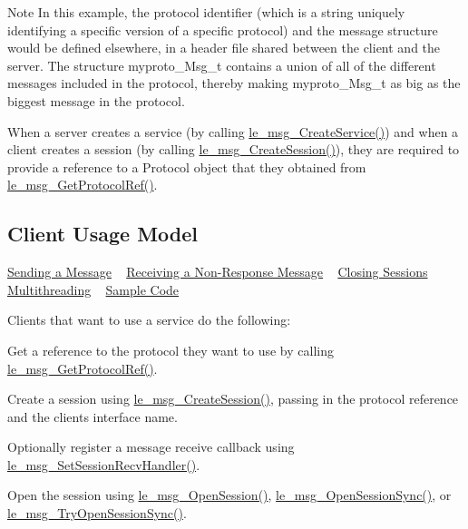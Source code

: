 \begin{DoxyNote}{Note}
In this example, the protocol identifier (which is a string uniquely identifying a specific version of a specific protocol) and the message structure would be defined elsewhere, in a header file shared between the client and the server. The structure {\ttfamily myproto\+\_\+\+Msg\+\_\+t} contains a {\ttfamily union} of all of the different messages included in the protocol, thereby making {\ttfamily myproto\+\_\+\+Msg\+\_\+t} as big as the biggest message in the protocol.
\end{DoxyNote}
When a server creates a service (by calling \hyperlink{le__messaging_8h_adbbb2737069b636028128c74ae407742}{le\+\_\+msg\+\_\+\+Create\+Service()}) and when a client creates a session (by calling \hyperlink{le__messaging_8h_a696d7c2d4e3725d3ddb5dd2d79d2d732}{le\+\_\+msg\+\_\+\+Create\+Session()}), they are required to provide a reference to a Protocol object that they obtained from \hyperlink{le__messaging_8h_adcd1ff1a6906433aaa6d7038125c4473}{le\+\_\+msg\+\_\+\+Get\+Protocol\+Ref()}.\hypertarget{c_messaging_c_messagingClientUsage}{}\subsection{Client Usage Model}\label{c_messaging_c_messagingClientUsage}
\hyperlink{c_messaging_c_messagingClientSending}{Sending a Message} ~\newline
 \hyperlink{c_messaging_c_messagingClientReceiving}{Receiving a Non-\/\+Response Message} ~\newline
 \hyperlink{c_messaging_c_messagingClientClosing}{Closing Sessions} ~\newline
 \hyperlink{c_messaging_c_messagingClientMultithreading}{Multithreading} ~\newline
 \hyperlink{c_messaging_c_messagingClientExample}{Sample Code}

Clients that want to use a service do the following\+:
\begin{DoxyEnumerate}
\item Get a reference to the protocol they want to use by calling {\ttfamily \hyperlink{le__messaging_8h_adcd1ff1a6906433aaa6d7038125c4473}{le\+\_\+msg\+\_\+\+Get\+Protocol\+Ref()}}.
\item Create a session using {\ttfamily \hyperlink{le__messaging_8h_a696d7c2d4e3725d3ddb5dd2d79d2d732}{le\+\_\+msg\+\_\+\+Create\+Session()}}, passing in the protocol reference and the client\textquotesingle{}s interface name.
\item Optionally register a message receive callback using {\ttfamily \hyperlink{le__messaging_8h_ac726cc93219d326e1b10a7d13a0f4f65}{le\+\_\+msg\+\_\+\+Set\+Session\+Recv\+Handler()}}.
\item Open the session using \hyperlink{le__messaging_8h_a574d37960a07c4fc2bde310408619cff}{le\+\_\+msg\+\_\+\+Open\+Session()}, \hyperlink{le__messaging_8h_a8c6480e3708e20e1f9da032a93c80bc0}{le\+\_\+msg\+\_\+\+Open\+Session\+Sync()}, or \hyperlink{le__messaging_8h_a2ee1410da1dc345c86d6958b6cdda5e1}{le\+\_\+msg\+\_\+\+Try\+Open\+Session\+Sync()}.
\end{DoxyEnumerate}


